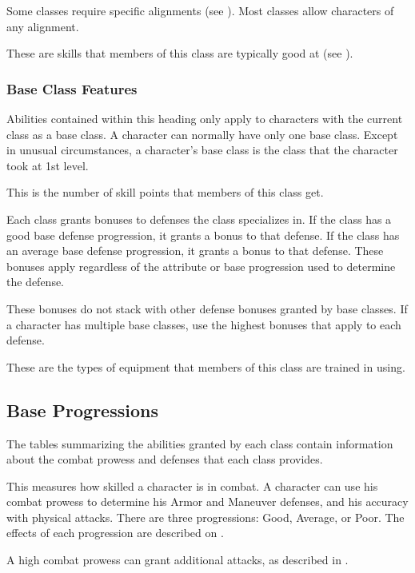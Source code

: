 Some classes require specific alignments (see ).
Most classes allow characters of any alignment.

These are skills that members of this class are typically good at (see ).

\subsubsection{Base Class Features}

Abilities contained within this heading only apply to characters with the current class as a base class.
A character can normally have only one base class.
Except in unusual circumstances, a character's base class is the class that the character took at 1st level.

This is the number of skill points that members of this class get.

Each class grants bonuses to defenses the class specializes in.
If the class has a good base defense progression, it grants a  bonus to that defense.
If the class has an average base defense progression, it grants a  bonus to that defense.
These bonuses apply regardless of the attribute or base progression used to determine the defense.

These bonuses do not stack with other defense bonuses granted by base classes.
If a character has multiple base classes, use the highest bonuses that apply to each defense.

These are the types of equipment that members of this class are trained in using.

\subsection{Base Progressions}

The tables summarizing the abilities granted by each class contain information about the combat prowess and defenses that each class provides.

This measures how skilled a character is in combat.
A character can use his combat prowess to determine his Armor and Maneuver defenses, and his accuracy with physical attacks.
There are three progressions: Good, Average, or Poor.
The effects of each progression are described on .

A high combat prowess can grant additional attacks, as described in .

